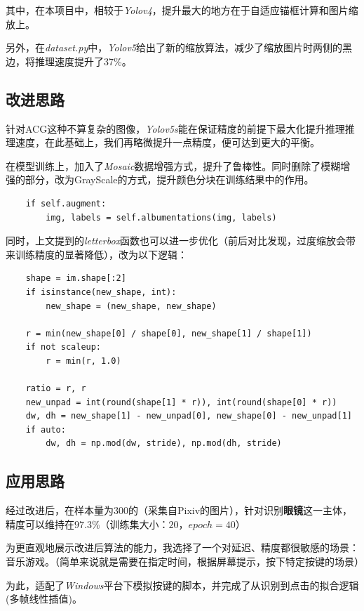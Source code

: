 \documentclass[a4paper]{ltxdoc}
\begin{document}
其中，在本项目中，相较于\textit{Yolov4}，提升最大的地方在于自适应锚框计算和图片缩放上。

另外，在\textit{dataset.py}中，\textit{Yolov5}给出了新的缩放算法，减少了缩放图片时两侧的黑边，将推理速度提升了37\%。

\subsection{改进思路}

针对ACG这种不算复杂的图像，\textit{Yolov5s}能在保证精度的前提下最大化提升推理推理速度，在此基础上，我们再略微提升一点精度，便可达到更大的平衡。

在模型训练上，加入了\textit{Mosaic}数据增强方式，提升了鲁棒性。同时删除了模糊增强的部分，改为GrayScale的方式，提升颜色分块在训练结果中的作用。

\begin{lstlisting}
    if self.augment:
        img, labels = self.albumentations(img, labels)
\end{lstlisting}

同时，上文提到的\textit{letterbox}函数也可以进一步优化（前后对比发现，过度缩放会带来训练精度的显著降低），改为以下逻辑：

\begin{lstlisting}
    shape = im.shape[:2]
    if isinstance(new_shape, int):
        new_shape = (new_shape, new_shape)

    r = min(new_shape[0] / shape[0], new_shape[1] / shape[1])
    if not scaleup:
        r = min(r, 1.0)

    ratio = r, r
    new_unpad = int(round(shape[1] * r)), int(round(shape[0] * r))
    dw, dh = new_shape[1] - new_unpad[0], new_shape[0] - new_unpad[1]
    if auto:
        dw, dh = np.mod(dw, stride), np.mod(dh, stride)
\end{lstlisting}

\subsection{应用思路}

经过改进后，在样本量为300的（采集自Pixiv的图片），针对识别\textbf{眼镜}这一主体，精度可以维持在$97.3\%$（训练集大小：$20$，$epoch = 40$）

为更直观地展示改进后算法的能力，我选择了一个对延迟、精度都很敏感的场景：音乐游戏。（简单来说就是需要在指定时间，根据屏幕提示，按下特定按键的场景）

为此，适配了\textit{Windows}平台下模拟按键的脚本，并完成了从识别到点击的拟合逻辑(多帧线性插值)。
\end{document}
